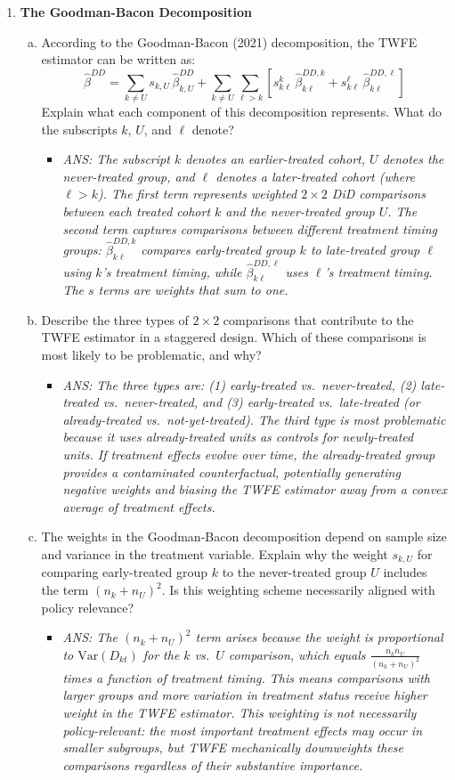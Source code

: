 \documentclass[12pt,a4paper]{article}
\newcommand{\ans}[1]{\begin{itemize}\item[$\bullet$] \textit{ANS: #1}\end{itemize}}
\begin{document}
\begin{enumerate}
\item \textbf{The Goodman-Bacon Decomposition}
\begin{enumerate}[(a)]
\item According to the Goodman-Bacon (2021) decomposition, the TWFE estimator can be written as:
\begin{equation*}
\hat{\beta}^{DD} = \sum_{k \neq U} s_{k,U}\,\hat{\beta}^{DD}_{k,U} + \sum_{k \neq U}\sum_{\ell > k}\left[ s^{k}_{k\ell}\,\hat{\beta}^{DD,k}_{k\ell} + s^{\ell}_{k\ell}\,\hat{\beta}^{DD,\ell}_{k\ell} \right]
\end{equation*}
Explain what each component of this decomposition represents. What do the subscripts $k$, $U$, and $\ell$ denote?
\ans{The subscript $k$ denotes an earlier-treated cohort, $U$ denotes the never-treated group, and $\ell$ denotes a later-treated cohort (where $\ell > k$). The first term represents weighted $2\times2$ DiD comparisons between each treated cohort $k$ and the never-treated group $U$. The second term captures comparisons between different treatment timing groups: $\hat{\beta}^{DD,k}_{k\ell}$ compares early-treated group $k$ to late-treated group $\ell$ using $k$'s treatment timing, while $\hat{\beta}^{DD,\ell}_{k\ell}$ uses $\ell$'s treatment timing. The $s$ terms are weights that sum to one.}

\item Describe the three types of $2\times2$ comparisons that contribute to the TWFE estimator in a staggered design. Which of these comparisons is most likely to be problematic, and why?
\ans{The three types are: (1) early-treated vs.\ never-treated, (2) late-treated vs.\ never-treated, and (3) early-treated vs.\ late-treated (or already-treated vs.\ not-yet-treated). The third type is most problematic because it uses already-treated units as controls for newly-treated units. If treatment effects evolve over time, the already-treated group provides a contaminated counterfactual, potentially generating negative weights and biasing the TWFE estimator away from a convex average of treatment effects.}

\item The weights in the Goodman-Bacon decomposition depend on sample size and variance in the treatment variable. Explain why the weight $s_{k,U}$ for comparing early-treated group $k$ to the never-treated group $U$ includes the term $(n_k + n_U)^{2}$. Is this weighting scheme necessarily aligned with policy relevance?
\ans{The $(n_k + n_U)^{2}$ term arises because the weight is proportional to $\mathrm{Var}(D_{kt})$ for the $k$ vs.\ $U$ comparison, which equals $\frac{n_k n_U}{(n_k+n_U)^{2}}$ times a function of treatment timing. This means comparisons with larger groups and more variation in treatment status receive higher weight in the TWFE estimator. This weighting is not necessarily policy-relevant: the most important treatment effects may occur in smaller subgroups, but TWFE mechanically downweights these comparisons regardless of their substantive importance.}
\end{enumerate}


\end{enumerate}
\end{document}
